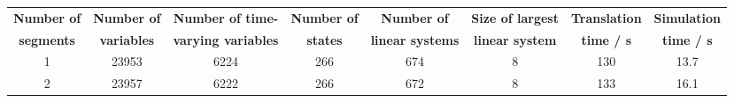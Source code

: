 \begin{tabular}{cccccccc}
  \toprule
  \textbf{Number of}  & \textbf{Number of} & \textbf{Number of time-} & \textbf{Number of} & \textbf{Number of} & \textbf{Size of largest} & \textbf{Translation} & \textbf{Simulation} \\
  \textbf{segments} & \textbf{variables} & \textbf{varying variables} & \textbf{states} & \textbf{linear systems} & \textbf{linear system} & \textbf{time / s} & \textbf{time / s} \\
  \midrule
  1 & 23953 & 6224 & 266 & 674 & 8 & 130 & 13.7 \\
  2 & 23957 & 6222 & 266 & 672 & 8 & 133 & 16.1 \\
  \bottomrule
\end{tabular}